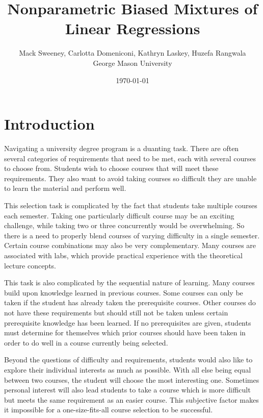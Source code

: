 \documentclass[10pt]{proc}
\title{Nonparametric Biased Mixtures of Linear Regressions}
\author{
    Mack Sweeney, Carlotta Domeniconi, Kathryn Laskey, Huzefa Rangwala\\
        George Mason University
}
\date{\today}
\begin{document}
\maketitle


\begin{abstract}

\end{abstract}


\section{Introduction}

Navigating a university degree program is a duanting task. There are often
several categories of requirements that need to be met, each with several
courses to choose from. Students wish to choose courses that will meet these
requirements. They also want to avoid taking courses so difficult they are
unable to learn the material and perform well.

This selection task is complicated by the fact that students take multiple
courses each semester. Taking one particularly difficult course may be an
exciting challenge, while taking two or three concurrently would be
overwhelming. So there is a need to properly blend courses of varying difficulty
in a single semester. Certain course combinations may also be very
complementary. Many courses are associated with labs, which provide practical
experience with the theoretical lecture concepts.

This task is also complicated by the sequential nature of learning. Many courses
build upon knowledge learned in previous courses. Some courses can only be taken
if the student has already taken the prerequisite courses. Other courses do not
have these requirements but should still not be taken unless certain
prerequisite knowledge has been learned. If no prerequisites are given, students
must determine for themselves which prior courses should have been taken in
order to do well in a course currently being selected.

Beyond the questions of difficulty and requirements, students would also like to
explore their individual interests as much as possible. With all else being
equal between two courses, the student will choose the most interesting one.
Sometimes personal interest will also lead students to take a course which is
more difficult but meets the same requirement as an easier course. This
subjective factor makes it impossible for a one-size-fits-all course selection
to be successful.
\end{document}
